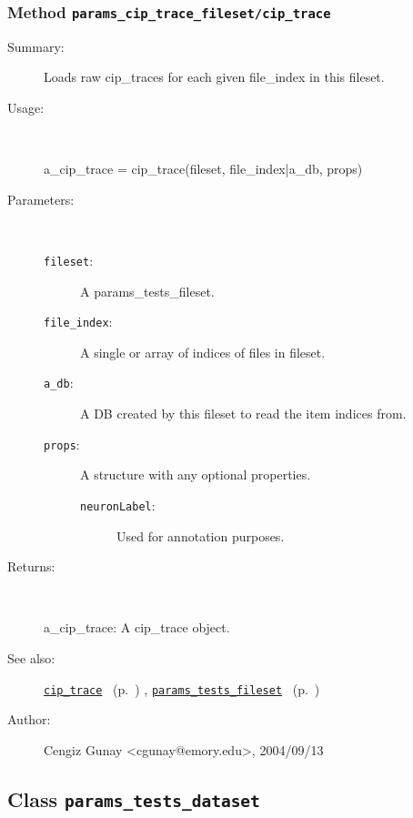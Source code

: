 \subsubsection[Method \texttt{cip\_trace}]{Method \texttt{params\_cip\_trace\_fileset/cip\_trace}}%
%
\label{ref_params_cip_trace_fileset__cip_trace}%
\hypertarget{ref_params_cip_trace_fileset__cip_trace}{}%
\begin{description}
\item[Summary:]Loads raw cip\_traces for each given file\_index in this fileset.
%
\item[Usage:]~%
\begin{lyxcode}%
a\_cip\_trace = cip\_trace(fileset, file\_index|a\_db, props)
%
\end{lyxcode}%
%
%
\item[Parameters:]~
\begin{description}%
\item[\texttt{fileset}:]
 A params\_tests\_fileset.
\item[\texttt{file\_index}:]
 A single or array of indices of files in fileset.
\item[\texttt{a\_db}:]
 A DB created by this fileset to read the item indices from.
\item[\texttt{props}:]
 A structure with any optional properties.
\begin{description}%
\item[\texttt{neuronLabel}:]
 Used for annotation purposes.
\end{description}%
\end{description}%
%
\item[Returns:]~

	a\_cip\_trace: A cip\_trace object.
%
%
\item[See also:]%
\hyperlink{ref_cip_trace}{\texttt{cip\_trace}}%
\ (p.~\pageref{ref_cip_trace})%
%
, \hyperlink{ref_params_tests_fileset}{\texttt{params\_tests\_fileset}}%
\ (p.~\pageref{ref_params_tests_fileset})%
%
%
\item[Author:]%
Cengiz Gunay <cgunay@emory.edu>, 2004/09/13%
\end{description}
\methodline%
\subsection{Class \texttt{params\_tests\_dataset}}%
%
\label{ref_params_tests_dataset}%
\hypertarget{ref_params_tests_dataset}{}%
